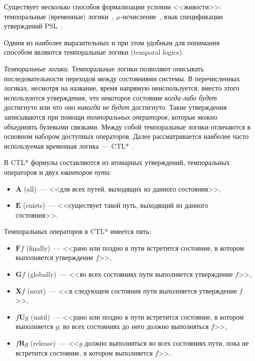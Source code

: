\documentclass[a4paper,notitlepage,14pt]{article}
\begin{document}
Существует несколько способов формализации условии <<живости>>: темпоральные (временные)
логики~\cite{Clarke,Pandya01modelchecking},
$\mu$-исчисление~\cite{Leucker_parallelmodel,Emerson97modelchecking}, язык спецификации
утверждений PSL~\cite{Glazberg_psl:beyond}.

Одним из наиболее выразительных и при этом удобным для понимания~\cite{Stirling96modaland}
способом являются темпоральные логики (temporal logics).

\textit{Темпоральные логики}. Темпоральные логики позволяют описывать последовательности
переходов между состояниями системы. В перечисленных логиках, несмотря на название, время
напрямую неиспользуется; вместо этого используются утверждения, что некоторое состояние
\emph{когда-либо будет} достигнуто или что оно \emph{никогда не будет} достигнуто. Такие
утверждения записываются при помощи \emph{темпоральных операторов}, которые можно
объединять булевыми связками. Между собой темпоральные логики отличаются в основном
набором доступных операторов. Далее рассматривается наиболее часто используемая временная
логика~--- CTL*~\cite{Stirling96modaland}.

В CTL* формулы составляются из атомарных утверждений, темпоральных операторов и
двух \emph{кванторов пути}:

\begin{itemize}
\item $\mathbf{A}$ (all)~--- <<для всех путей, выходящих из данного состояния>>,
\item $\mathbf{E}$ (exists)~--- <<существует такой путь, выходящий из данного состояния>>.
\end{itemize}

Темпоральных операторов в CTL* имеется пять:

\begin{itemize}
\item $\mathbf{F} f$ (finally)~--- <<рано или поздно в пути встретится состояние, в котором
  выполняется утверждение $f$>>,
\item $\mathbf{G} f$ (globally)~--- <<во всех состояниях пути выполняется утверждение
  $f$>>,
\item $\mathbf{X} f$ (next)~--- <<в следующем состояния пути выполняется утверждение
  $f$>>,
\item $f \mathbf{U} g$ (until)~--- <<рано или поздно в пути встретится состояние, в
  котором выполняется $g$; во всех состояниях до него должно выполняться $f$>>,
\item $f \mathbf{R} g$ (release)~--- <<$g$ должно выполняться во всех состояниях пути,
  пока не встретится состояние, в котором выполняется $f$>>.
\end{itemize}
\end{document}
